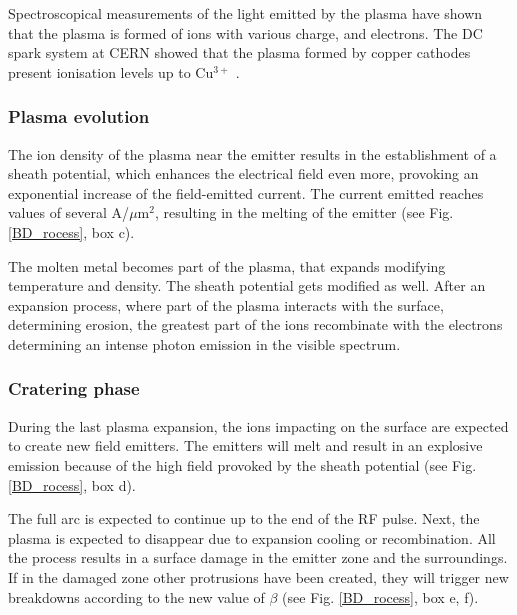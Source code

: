 Spectroscopical measurements of the light emitted by the plasma have shown that the plasma is formed of ions with various charge, and electrons. The DC spark system at CERN showed that the plasma formed by copper cathodes present ionisation levels up to Cu$^{3+}$ \cite{Kovermann:1330346}.


\subsubsection[Plasma evolution]{Plasma evolution}

The ion density of the plasma near the emitter results in the establishment of a sheath potential, which enhances the electrical field even more, provoking an exponential  increase of the field-emitted current. The current emitted reaches values of several A/$\mu$m$^2$, resulting in the melting of the emitter (see Fig. \ref{BD_rocess}, box c).

The molten metal becomes part of the plasma, that expands modifying temperature and density. The sheath potential gets modified as well. After an expansion process, where part of the plasma interacts with the surface, determining erosion, the greatest part of the ions recombinate with the electrons determining an intense photon emission in the visible spectrum.


\subsubsection[Cratering phase]{Cratering phase}

During the last plasma expansion, the ions impacting on the surface are expected to create new field emitters. The emitters will melt and result in an explosive emission because of the high field provoked by the sheath potential (see Fig. \ref{BD_rocess}, box d). 

The full arc is expected to continue up to the end of the RF pulse. Next, the plasma is expected to disappear due to expansion cooling or recombination. All the process results in a surface damage in the emitter zone and the surroundings. If in the damaged zone other protrusions have been created, they will trigger new breakdowns according to the new value of $\beta$ (see Fig. \ref{BD_rocess}, box e, f). 

